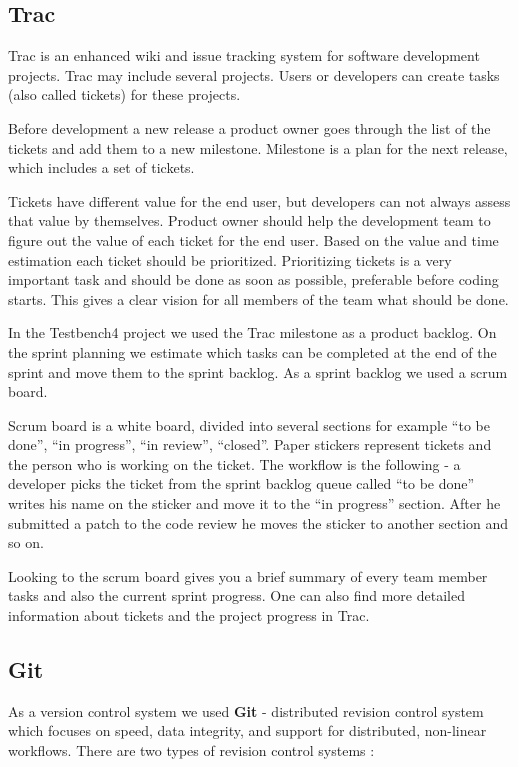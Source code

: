   \subsection{Trac}
  Trac is an enhanced wiki and issue tracking system for software development
  projects. Trac may include several projects. Users or developers can
  create tasks (also called tickets) for these projects. 
  
   Before development a new release a product owner goes through 
   the list of the tickets and add them to a new milestone.
  Milestone is a plan for the next release, which includes a set of tickets.

  Tickets have different value for the end user, but developers can not always
  assess that value by themselves. Product owner should help the development team
   to figure out the
  value of each ticket for the end user. Based on the value and time estimation
   each ticket should be prioritized.
  Prioritizing tickets is a very important task and should be done as soon as
  possible, preferable before coding starts. This gives a clear vision for all
  members of the team what should be done.

  In the Testbench4 project we used the Trac milestone as a product backlog. On
  the sprint planning we estimate which tasks can be completed at the end of the sprint 
  and move them to the sprint backlog. As a sprint backlog we used a scrum
  board.
  
  Scrum board is a white board, divided into several sections for example ``to be done'', ``in progress'', ``in review'',
  ``closed''. Paper stickers represent tickets and the person who is working on
  the ticket.  
  The workflow is the following - a developer picks the
  ticket from the sprint backlog queue called ``to be done'' 
  writes his name on the sticker and move it to the ``in progress'' section.
  After he submitted a patch to the code review he moves the sticker to another
  section and so on.
  
  Looking to the scrum board gives you a brief summary of every team member tasks and 
  also the current sprint progress. One can also find more detailed information
  about tickets and the project progress in Trac.
 
 \subsection{Git}
  As a version control system we used \textbf{Git} - distributed revision control system
  which focuses on speed, data integrity, and support for distributed,
  non-linear workflows. There are two types of revision control systems :
  

